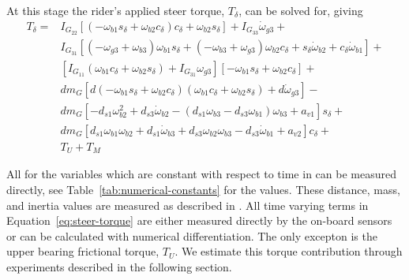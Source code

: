 \documentclass[10pt]{article}
\begin{document}
At this stage the rider's applied steer torque, $T_\delta$, can be solved for,
giving
%
\begin{align}
  T_{\delta} =
    & I_{G_{22}} \left[ \left( -\omega_{b1} s_\delta + \omega_{b2} c_\delta \right)
      c_\delta + \omega_{b2} s_\delta \right] + I_{G_{33}} \dot{\omega}_{g3} + \nonumber \\
    & I_{G_{31}} \left[ (-\omega_{g3} + \omega_{b3} ) \omega_{b1} s_\delta +
      (-\omega_{b3} + \omega_{g3}) \omega_{b2} c_\delta +
      s_\delta \dot{\omega}_{b2} + c_\delta \dot{\omega}_{b1} \right] + \nonumber \\
    & \left[ I_{G_{11}} (\omega_{b1} c_\delta + \omega_{b2}s_\delta) +
      I_{G_{31}} \omega_{g3} \right] \left[-\omega_{b1} s_\delta +
      \omega_{b2} c_\delta \right] + \nonumber \\
    & d m_G \left[ d (-\omega_{b1} s_\delta + \omega_{b2} c_\delta)
      (\omega_{b1} c_\delta + \omega_{b2} s_\delta) + d \dot{\omega}_{g3} \right] - \nonumber \\
    & d m_G \left[-d_{s1} \omega_{b2}^{2} + d_{s3} \dot{\omega}_{b2} -
      (d_{s1} \omega_{b3} - d_{s3} \omega_{b1}) \omega_{b3} + a_{v1} \right] s_\delta + \nonumber \\
    & d m_G \left[d_{s1} \omega_{b1} \omega_{b2} + d_{s1} \dot{\omega}_{b3} +
      d_{s3} \omega_{b2} \omega_{b3} - d_{s3} \dot{\omega}_{b1} + a_{v2} \right]
      c_\delta + \nonumber \\
    & T_U + T_M
    \label{eq:steer-torque}
\end{align}

All for the variables which are constant with respect to time in can be
measured directly, see Table~\ref{tab:numerical-constants} for the values.
These distance, mass, and inertia values are measured as described in
\cite{Moore2012}. All time varying terms in Equation~\ref{eq:steer-torque} are
either measured directly by the on-board sensors or can be calculated with
numerical differentiation. The only excepton is the upper bearing frictional
torque, $T_U$. We estimate this torque contribution through experiments
described in the following section.
\end{document}
